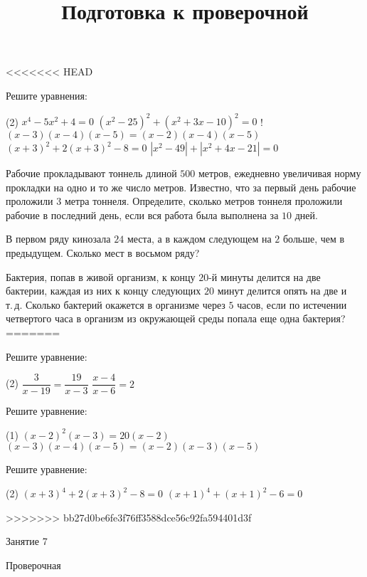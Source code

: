 \begin{homework}[number=4]
	\begin{listofex}
<<<<<<< HEAD
		\item  Решите уравнения:
		\begin{tasks}(2)
			\task \( x^4-5x^2+4=0 \)
			\task \( (x^2-25)^2+(x^2+3x-10)^2=0 \)
			\task! \( (x-3)(x-4)(x-5)=(x-2)(x-4)(x-5) \)
			\task \( (x+3)^2+2(x+3)^2-8=0 \)
			\task \( |x^2-49|+|x^2+4x-21|=0 \)
		\end{tasks}
		\item Рабочие прокладывают тоннель длиной \( 500 \) метров, ежедневно увеличивая норму прокладки на одно и то же число метров. Известно, что за первый день рабочие проложили \( 3 \) метра тоннеля. Определите, сколько метров тоннеля проложили рабочие в последний день, если вся работа была выполнена за \( 10 \) дней.
		\item В первом ряду кинозала \( 24 \) места, а в каждом следующем на \( 2 \) больше, чем в предыдущем. Сколько мест в восьмом ряду?
		\item Бактерия, попав в живой организм, к концу \( 20 \)-й минуты делится на две бактерии, каждая из них к концу следующих \( 20 \) минут делится опять на две и т. д. Сколько бактерий окажется в организме через \( 5 \) часов, если по истечении четвертого часа в организм из окружающей среды попала еще одна бактерия?
=======
		\item Решите уравнение:
		\begin{tasks}(2)
			\task \( \dfrac{3}{x-19}=\dfrac{19}{x-3} \)
			\task \( \dfrac{x-4}{x-6}=2 \)
		\end{tasks}
		\item Решите уравнение:
		\begin{tasks}(1)
			\task \( (x-2)^{2}(x-3)=20(x-2) \)
			\task \( (x-3)(x-4)(x-5)=(x-2)(x-3)(x-5) \)
		\end{tasks}
		\item Решите уравнение:
		\begin{tasks}(2)
			\task \( (x+3)^{4}+2(x+3)^{2}-8=0 \)
			\task \( (x+1)^{4}+(x+1)^{2}-6=0 \)
		\end{tasks}
>>>>>>> bb27d0be6fe3f76ff3588dce56c92fa594401d3f
	\end{listofex}
\end{homework}

\begin{class}[number=7]
	\title{Подготовка к проверочной}
	\begin{listofex}
		\item Занятие 7
	\end{listofex}
\end{class}

\begin{exam}
	\begin{listofex}
		\item Проверочная
	\end{listofex}
\end{exam}
